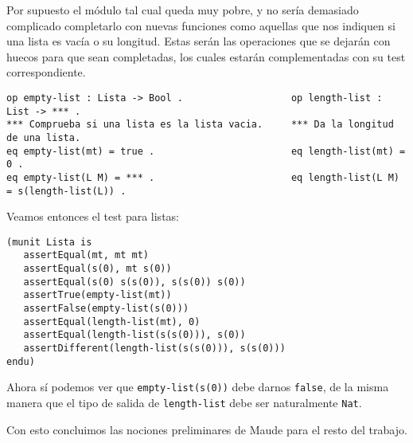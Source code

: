 Por supuesto el módulo tal cual queda muy pobre, y no sería demasiado complicado completarlo con nuevas funciones como aquellas que nos indiquen si una lista es vacía o su longitud. Estas serán las operaciones que  se dejarán con huecos para que sean completadas, los cuales estarán complementadas con su test correspondiente. \par

{\codesize
\begin{verbatim}
op empty-list : Lista -> Bool .                   op length-list : List -> *** .
*** Comprueba si una lista es la lista vacia.     *** Da la longitud de una lista.
eq empty-list(mt) = true .                        eq length-list(mt) = 0 .
eq empty-list(L M) = *** .                        eq length-list(L M) = s(length-list(L)) .
\end{verbatim}
}

Veamos entonces el test para listas: \par

\begin{verbatim}
(munit Lista is
   assertEqual(mt, mt mt)
   assertEqual(s(0), mt s(0))
   assertEqual(s(0) s(s(0)), s(s(0)) s(0))
   assertTrue(empty-list(mt))
   assertFalse(empty-list(s(0)))
   assertEqual(length-list(mt), 0)
   assertEqual(length-list(s(s(0))), s(0))
   assertDifferent(length-list(s(s(0))), s(s(0)))
endu)
\end{verbatim}

Ahora sí podemos ver que \verb"empty-list(s(0))" debe darnos \texttt{false}, de la misma manera que el tipo de salida de \verb"length-list" debe ser naturalmente \texttt{Nat}.\par 

Con esto concluimos las nociones preliminares de Maude para el resto del trabajo.\par 

